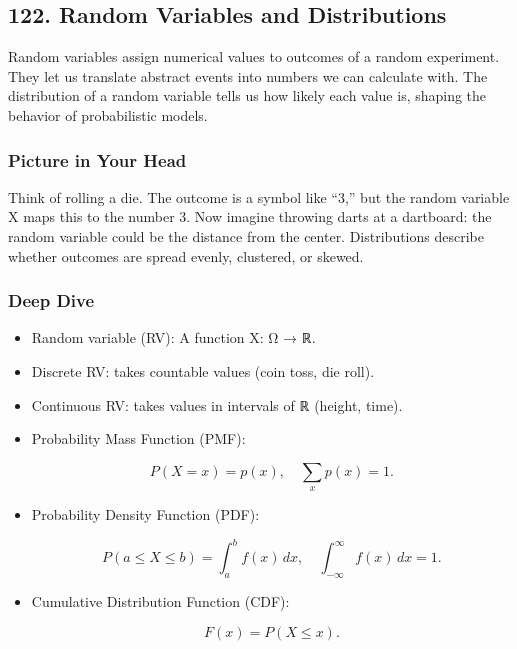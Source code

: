 \documentclass[
  letterpaper,
  DIV=11,
  numbers=noendperiod]{scrreprt}
\begin{document}
\subsection{122. Random Variables and
Distributions}\label{random-variables-and-distributions}

Random variables assign numerical values to outcomes of a random
experiment. They let us translate abstract events into numbers we can
calculate with. The distribution of a random variable tells us how
likely each value is, shaping the behavior of probabilistic models.

\subsubsection{Picture in Your Head}\label{picture-in-your-head-121}

Think of rolling a die. The outcome is a symbol like ``3,'' but the
random variable X maps this to the number 3. Now imagine throwing darts
at a dartboard: the random variable could be the distance from the
center. Distributions describe whether outcomes are spread evenly,
clustered, or skewed.

\subsubsection{Deep Dive}\label{deep-dive-121}

\begin{itemize}
\item
  Random variable (RV): A function X: Ω → ℝ.
\item
  Discrete RV: takes countable values (coin toss, die roll).
\item
  Continuous RV: takes values in intervals of ℝ (height, time).
\item
  Probability Mass Function (PMF):

  \[
  P(X = x) = p(x), \quad \sum_x p(x) = 1.
  \]
\item
  Probability Density Function (PDF):

  \[
  P(a \leq X \leq b) = \int_a^b f(x)\,dx, \quad \int_{-\infty}^\infty f(x)\,dx = 1.
  \]
\item
  Cumulative Distribution Function (CDF):

  \[
  F(x) = P(X \leq x).
  \]
\end{itemize}
\end{document}
